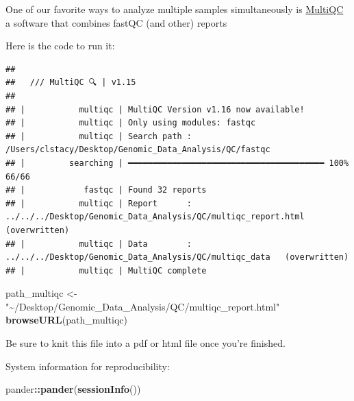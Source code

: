 \documentclass[
]{book}
\newenvironment{Shaded}{\begin{snugshade}}{\end{snugshade}}
\newcommand{\AttributeTok}[1]{\textcolor[rgb]{0.13,0.29,0.53}{#1}}
\newcommand{\CommentTok}[1]{\textcolor[rgb]{0.56,0.35,0.01}{\textit{#1}}}
\newcommand{\ExtensionTok}[1]{#1}
\newcommand{\FunctionTok}[1]{\textcolor[rgb]{0.13,0.29,0.53}{\textbf{#1}}}
\newcommand{\NormalTok}[1]{#1}
\newcommand{\OperatorTok}[1]{\textcolor[rgb]{0.81,0.36,0.00}{\textbf{#1}}}
\newcommand{\OtherTok}[1]{\textcolor[rgb]{0.56,0.35,0.01}{#1}}
\newcommand{\SpecialCharTok}[1]{\textcolor[rgb]{0.81,0.36,0.00}{\textbf{#1}}}
\newcommand{\StringTok}[1]{\textcolor[rgb]{0.31,0.60,0.02}{#1}}
\newcommand{\VariableTok}[1]{\textcolor[rgb]{0.00,0.00,0.00}{#1}}
\begin{document}
One of our favorite ways to analyze multiple samples simultaneously is \href{https://multiqc.info/}{MultiQC} a software that combines fastQC (and other) reports

Here is the code to run it:

\begin{Shaded}
\end{Shaded}

\begin{verbatim}
## 
##   /// MultiQC 🔍 | v1.15
## 
## |           multiqc | MultiQC Version v1.16 now available!
## |           multiqc | Only using modules: fastqc
## |           multiqc | Search path : /Users/clstacy/Desktop/Genomic_Data_Analysis/QC/fastqc
## |         searching | ━━━━━━━━━━━━━━━━━━━━━━━━━━━━━━━━━━━━━━━━ 100% 66/66  
## |            fastqc | Found 32 reports
## |           multiqc | Report      : ../../../Desktop/Genomic_Data_Analysis/QC/multiqc_report.html   (overwritten)
## |           multiqc | Data        : ../../../Desktop/Genomic_Data_Analysis/QC/multiqc_data   (overwritten)
## |           multiqc | MultiQC complete
\end{verbatim}

\begin{Shaded}
\begin{Highlighting}[]
\NormalTok{path\_multiqc }\OtherTok{\textless{}{-}} \StringTok{"\textasciitilde{}/Desktop/Genomic\_Data\_Analysis/QC/multiqc\_report.html"}
\FunctionTok{browseURL}\NormalTok{(path\_multiqc)}
\end{Highlighting}
\end{Shaded}

Be sure to knit this file into a pdf or html file once you're finished.

System information for reproducibility:

\begin{Shaded}
\begin{Highlighting}[]
\NormalTok{pander}\SpecialCharTok{::}\FunctionTok{pander}\NormalTok{(}\FunctionTok{sessionInfo}\NormalTok{())}
\end{Highlighting}
\end{Shaded}
\end{document}
